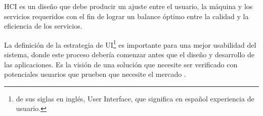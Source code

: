 HCI es un diseño que debe producir un ajuste entre el usuario, la máquina y los servicios requeridos con el fin de lograr un balance óptimo entre la calidad y la eficiencia de los servicios.

La definición de la estrategia de UI\footnote{de sus siglas en inglés, User Interface, que significa en español experiencia de usuario.} es importante para una mejor usabilidad del sistema, donde este proceso debería comenzar antes que el diseño y desarrollo de las aplicaciones. Es la visión de una solución que necesite ser verificado con potenciales usuarios que prueben que necesite el mercado \citep{levy_ux_2015}.

